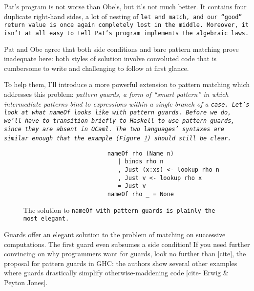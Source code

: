 \documentclass[manuscript,screen,review, 12pt]{acmart}
\begin{document}
    Pat's program is not worse than Obe's, but it's not much better. It contains
    four duplicate right-hand sides, a lot of nesting of \tt{let} and
    \tt{match}, and our “good” return value is once again completely lost in the
    middle. Moreover, it isn't at all easy to tell Pat's program implements the
    algebraic laws.
    
    Pat and Obe agree that both side conditions and bare pattern matching prove
    inadequate here: both styles of solution involve convoluted code that is
    cumbersome to write and challenging to follow at first glance. 
    
    To help them, I'll introduce a more powerful extension to pattern matching
    which addresses this problem: \it{pattern guards}, a form of “smart pattern”
    in which intermediate patterns bind to expressions within a single branch of
    a \tt{case}. Let's look at what \tt{nameOf} looks like with pattern guards.
    Before we do, we'll have to transition briefly to Haskell to use pattern
    guards, since they are absent in OCaml. The two languages' syntaxes are
    similar enough that the example (Figure~\ref{fig:guardnameof}) should still
    be clear. 

    \begin{figure}[hbt!]  
        \begin{center}
        \begin{verbatim}
                        nameOf rho (Name n)
                           | binds rho n 
                           , Just (x:xs) <- lookup rho n
                           , Just v <- lookup rho x
                           = Just v
                        nameOf rho _ = None
        \end{verbatim}
        \end{center}    
    \caption{The solution to \tt{nameOf} with pattern guards is plainly the most
    elegant.} 
    \label{fig:guardnameof}
    \end{figure}

    Guards offer an elegant solution to the problem of matching on successive
    computations. The first guard even subsumes a side condition! If you need
    further convincing on why programmers want for guards, look no further than
    [cite], the proposal for pattern guards in GHC: the authors show several
    other examples where guards drastically simplify otherwise-maddening code
    [cite- Erwig \& Peyton Jones]. 
    
\end{document}

